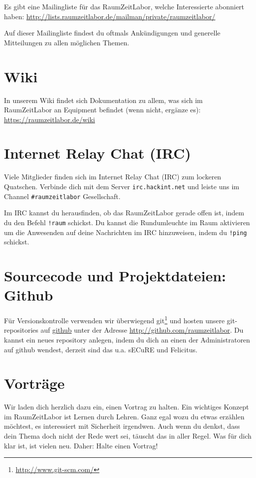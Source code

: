 \documentclass[12pt, DIV16, a4paper]{scrartcl}
\begin{document}
Es gibt eine Mailingliste für das RaumZeitLabor, welche Interessierte abonniert
haben:
\url{http://lists.raumzeitlabor.de/mailman/private/raumzeitlabor/}
\np

Auf dieser Mailingliste findest du oftmals Ankündigungen und generelle
Mitteilungen zu allen möglichen Themen.

\section*{Wiki}

In unserem Wiki findet sich Dokumentation zu allem, was sich im RaumZeitLabor
an Equipment befindet (wenn nicht, ergänze es): \url{https://raumzeitlabor.de/wiki}

\section*{Internet Relay Chat (IRC)}

Viele Mitglieder finden sich im Internet Relay Chat (IRC) zum lockeren
Quatschen. Verbinde dich mit dem Server \texttt{irc.hackint.net} und leiste uns
im Channel \texttt{\#raumzeitlabor} Gesellschaft.
\np

Im IRC kannst du herausfinden, ob das RaumZeitLabor gerade offen ist, indem du
den Befehl \texttt{!raum} schickst. Du kannst die Rundumleuchte im Raum
aktivieren um die Anwesenden auf deine Nachrichten im IRC hinzuweisen, indem
du \texttt{!ping} schickst.

\section*{Sourcecode und Projektdateien: Github}

Für Versionskontrolle verwenden wir überwiegend
git\footnote{\url{http://www.git-scm.com/}} und hosten unsere git-repositories
auf \href{http://github.com/}{github} unter der Adresse
\url{http://github.com/raumzeitlabor}. Du kannst ein neues repository anlegen,
indem du dich an einen der Administratoren auf github wendest, derzeit sind das
u.a. sECuRE und Felicitus.

\section*{Vorträge}

Wir laden dich herzlich dazu ein, einen Vortrag zu halten. Ein wichtiges
Konzept im RaumZeitLabor ist Lernen durch Lehren. Ganz egal wozu du etwas
erzählen möchtest, es interessiert mit Sicherheit irgendwen. Auch wenn du
denkst, dass dein Thema doch nicht der Rede wert sei, täuscht das in aller
Regel. Was für dich klar ist, ist vielen neu. Daher: Halte einen Vortrag!
\np
\end{document}
